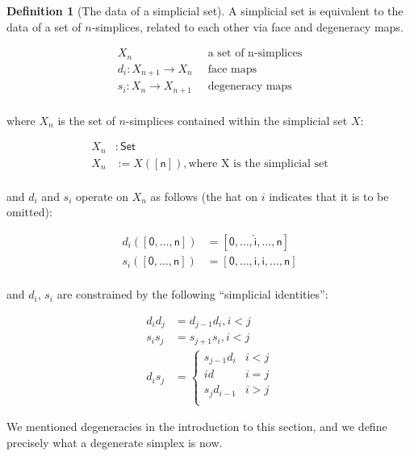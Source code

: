 \documentclass[10pt]{amsart}
\newcommand{\Set}{\ensuremath{\mathsf{Set}}}
\newcommand{\sq}[1]{\ensuremath{\mathsf{[#1]}}}
\theoremstyle{definition}
\newtheorem{definition}{Definition}[section]
\numberwithin{definition}{subsection}
\numberwithin{definition}{section}
\begin{document}
\begin{definition}[The data of a simplicial set]
  A simplicial set is equivalent to the data of a set of $n$-simplices, related to each other via face and degeneracy maps.

  \begin{align*}
    X_n                             & \;\;\text{a set of n-simplices} \\
    d_i : X_{n + 1} \rightarrow X_n & \;\;\text{face maps}            \\
    s_i : X_n \rightarrow X_{n + 1} & \;\;\text{degeneracy maps}      \\
  \end{align*}

  where $X_n$ is the set of $n$-simplices contained within the simplicial set $X$:

  \begin{align*}
    X_n & : \Set                                             \\
    X_n & := X(\sq{n}), \text{where X is the simplicial set} \\
  \end{align*}

  and $d_i$ and $s_i$ operate on $X_n$ as follows (the hat on $i$ indicates that it is to be omitted):

  \begin{align*}
    d_i(\sq{0, \ldots, n}) & = \sq{0, \ldots, \hat{i}, \ldots, n} \\
    s_i(\sq{0, \ldots, n}) & = \sq{0, \ldots, i, i, \ldots, n}    \\
  \end{align*}

  and $d_i$, $s_i$ are constrained by the following ``simplicial identities'':

  \begin{align*}
    d_i d_j & = d_{j - 1} d_i, i < j \\
    s_i s_j & = s_{j + 1} s_i, i < j \\
    d_i s_j & =
    \begin{cases}
      s_{j - 1} d_i & i < j \\
      id            & i = j \\
      s_j d_{i - 1} & i > j \\
    \end{cases}
  \end{align*}
\end{definition}

We mentioned degeneracies in the introduction to this section, and we define precisely what a degenerate simplex is now.
\end{document}
